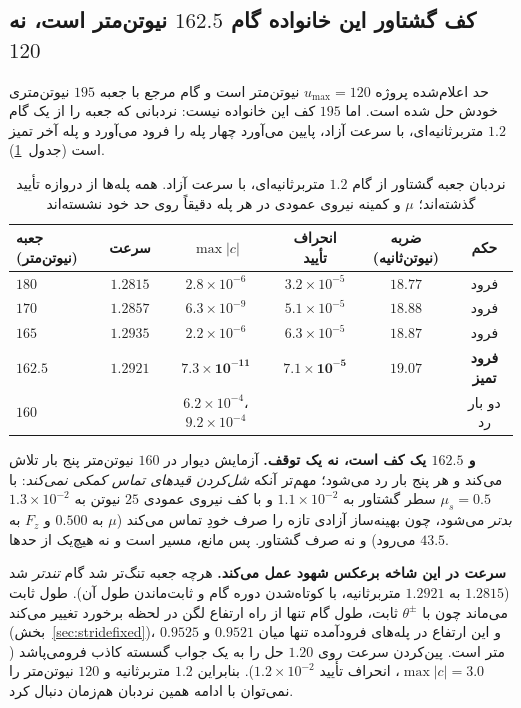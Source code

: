 \documentclass[10pt,twocolumn]{article}
\newcommand{\nd}{\lr{\textendash}}
\begin{document}
\subsection{کف گشتاور این خانواده گام $162.5$ نیوتن‌متر است، نه $120$}
\label{sec:torquefloor}
حد اعلام‌شده پروژه $u_{\max}=120$ نیوتن‌متر است و گام مرجع با جعبه $195$ نیوتن‌متری خودش
حل شده است. اما $195$ کف این خانواده نیست: نردبانی که جعبه را از یک گام $1.2$
متربرثانیه‌ای، با سرعت آزاد، پایین می‌آورد چهار پله را فرود می‌آورد و پله آخر تمیز است
(جدول~\ref{tab:torquefloor}).

\begin{table}[H]
    \centering
    \caption{نردبان جعبه گشتاور از گام $1.2$ متربرثانیه‌ای، با سرعت آزاد. همه پله‌ها
    از دروازه تأیید گذشته‌اند؛ $\mu$ و کمینه نیروی عمودی در هر پله دقیقاً روی حد خود
    نشسته‌اند}
    \label{tab:torquefloor}
    \small
    \begin{tabular}{lccccc}
        \toprule
        جعبه (نیوتن‌متر) & سرعت & $\max|c|$ & انحراف تأیید & ضربه (نیوتن‌ثانیه) & حکم \\
        \midrule
        $180$   & $1.2815$ & $2.8\times10^{-6}$  & $3.2\times10^{-5}$ & $18.77$ & فرود \\
        $170$   & $1.2857$ & $6.3\times10^{-9}$  & $5.1\times10^{-5}$ & $18.88$ & فرود \\
        $165$   & $1.2935$ & $2.2\times10^{-6}$  & $6.3\times10^{-5}$ & $18.87$ & فرود \\
        $\mathbf{162.5}$ & $\mathbf{1.2921}$ & $\mathbf{7.3\times10^{-11}}$ & $\mathbf{7.1\times10^{-5}}$ & $19.07$ & \textbf{فرود تمیز} \\
        $160$   & \nd{} & $6.2\times10^{-4}$، $9.2\times10^{-4}$ & \nd{} & \nd{} & دو بار رد \\
        \bottomrule
    \end{tabular}
\end{table}

\textbf{و $162.5$ یک کف است، نه یک توقف.} آزمایش دیوار در $160$ نیوتن‌متر پنج
بار تلاش می‌کند و هر پنج بار رد می‌شود؛ مهم‌تر آنکه \emph{شل‌کردن قیدهای تماس کمکی نمی‌کند}:
با $\mu_s=0.5$ سطر گشتاور به $1.1\times10^{-2}$ و با کف نیروی عمودی $25$ نیوتن به
$1.3\times10^{-2}$ \emph{بدتر} می‌شود، چون بهینه‌ساز آزادی تازه را صرف خودِ تماس می‌کند
($\mu$ به $0.500$ و $F_z$ به $43.5$ می‌رود) و نه صرف گشتاور. پس مانع، مسیر است و نه هیچ‌یک
از حدها.

\textbf{سرعت در این شاخه برعکس شهود عمل می‌کند.} هرچه جعبه تنگ‌تر شد گام \emph{تندتر} شد
($1.2815$ به $1.2921$ متربرثانیه، با کوتاه‌شدن دوره گام و ثابت‌ماندن طول آن). طول ثابت
می‌ماند چون با $\theta^\pm$ ثابت، طول گام تنها از راه ارتفاع لگن در لحظه برخورد تغییر می‌کند
(بخش~\ref{sec:stridefixed})، و این ارتفاع در پله‌های فرودآمده تنها میان $0.9521$ و $0.9525$
متر است. پین‌کردن
سرعت روی $1.20$ حل را به یک جواب گسسته کاذب فرومی‌پاشد ($\max|c|=3.0$، انحراف تأیید
$1.2\times10^{-2}$). بنابراین $1.2$ متربرثانیه و $120$ نیوتن‌متر را نمی‌توان با ادامه همین
نردبان هم‌زمان دنبال کرد.
\end{document}
